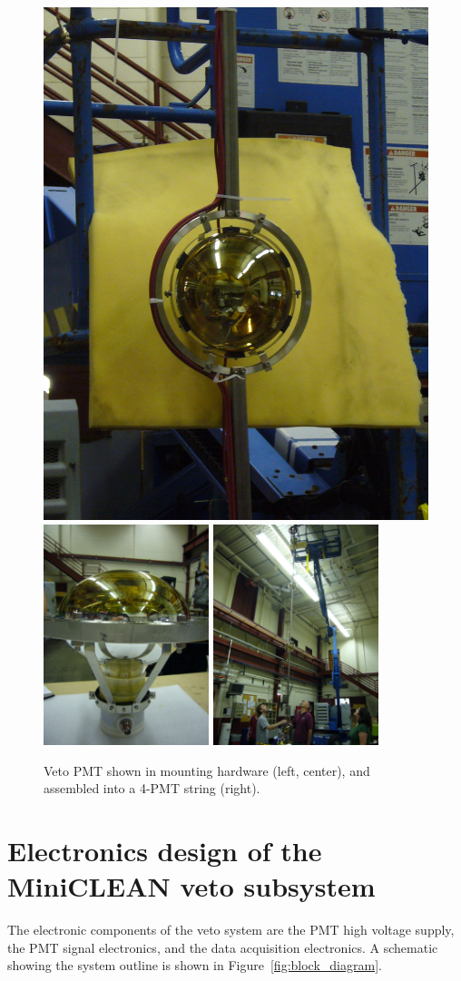 \documentclass{JINST}
\begin{document}
\begin{figure}[ht]
\begin{center}
\includegraphics[width=2.in]{graphics/singlepmtmounted1.jpg}
\includegraphics[width=1.9in]{graphics/singlepmtmounted2.jpg}
\includegraphics[width=1.9in]{graphics/pmtstring.jpg}
\caption{Veto PMT shown in mounting hardware (left, center), and assembled into a 4-PMT string (right).
\label{fig:vetopmtmountpic}}
\end{center}
\end{figure}


\section{Electronics design of the MiniCLEAN veto subsystem}
\label{sec:electronics_design}
%
The electronic components of the veto system are the PMT high voltage
supply, the PMT signal electronics, and the data acquisition
electronics.  A schematic showing the system outline is shown in
Figure~\ref{fig:block_diagram}.
\end{document}
